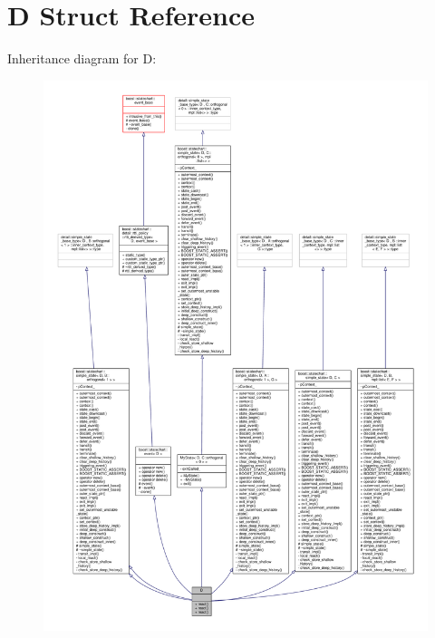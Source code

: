 \hypertarget{struct_d}{}\section{D Struct Reference}
\label{struct_d}


Inheritance diagram for D\+:
\nopagebreak
\begin{figure}[H]
\begin{center}
\leavevmode
\includegraphics[width=350pt]{struct_d__inherit__graph}
\end{center}
\end{figure}


